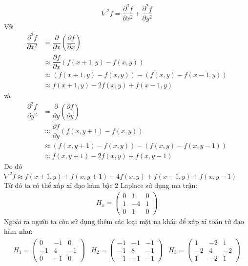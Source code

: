 \documentclass[12pt, oneside, a4paper]{book}
\begin{document}
\begin{equation*}
\nabla ^2 f=\dfrac{\partial^2 f }{\partial x^2}+\dfrac{\partial^2 f }{\partial y^2}
\end{equation*}
Với
\begin{equation*}
\begin{split}
\dfrac{\partial^2 f }{\partial x^2} &=\dfrac{\partial}{\partial x}(\dfrac{\partial f}{\partial x})\\
&\approx \dfrac{\partial f}{\partial x} (f(x+1,y)-f(x,y))\\
&\approx (f(x+1,y)-f(x,y))-(f(x,y)-f(x-1,y))\\
&\approx f(x+1,y)-2f(x,y)+f(x-1,y)
\end{split}
\end{equation*} 
và  
\begin{equation*}
\begin{split}
\dfrac{\partial^2 f }{\partial y^2} &=\dfrac{\partial}{\partial y}(\dfrac{\partial f}{\partial y})\\
&\approx \dfrac{\partial f}{\partial y} (f(x,y+1)-f(x,y))\\
& \approx (f(x,y+1)-f(x,y))-(f(x,y)-f(x,y-1)) \\
& \approx f(x,y+1)-2f(x,y)+f(x,y-1)
\end{split}
\end{equation*} 
 Do đó $\nabla ^2 f\approx f(x+1,y)+f(x,y+1)-4f(x,y)+f(x-1,y)+f(x,y-1)$\\
Từ đó ta có thể xấp xỉ đạo hàm bậc 2 Laplace sử dụng ma trận: 
\begin{align*}
   H_x= \begin{pmatrix}
        0 & 1 & 0 \\
        1 & -4 & 1  \\
        0 & 1 & 0
    \end{pmatrix}
\end{align*}
 Ngoài ra người ta còn sử dụng thêm các loại mặt nạ khác để xấp xỉ toán tử đạo hàm như:
 \begin{align*}
    \begin{matrix}
       H_1= \begin{pmatrix}
        0 & -1 & 0 \\
        -1 & 4 & -1  \\
        0 & -1 & 0
    \end{pmatrix} & H_2=\begin{pmatrix}
        -1 & -1 & -1 \\
        -1 & 8 & -1  \\
        -1 & -1 & -1
    \end{pmatrix} & H_3=\begin{pmatrix}
         1 & -2 & 1 \\
        -2 & 4 & -2  \\
        1 & -2 & 1
   \end{pmatrix}\\
    \end{matrix}
\end{align*}
\end{document}
